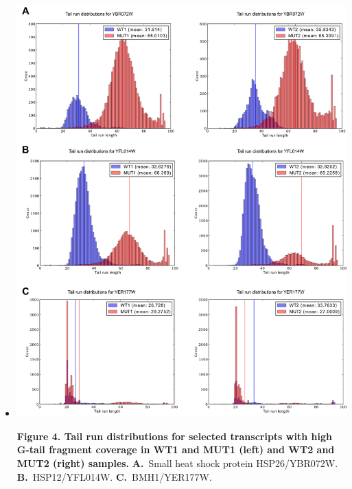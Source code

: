 \documentclass[10pt]{article}
\newcommand{\note}[1]{\textcolor{red}{[#1]}}  %
\begin{document}
\begin{itemize}
\item[]{
\begin{center}
\includegraphics[scale=0.9]{Figure5.png}
\end{center}

\textbf{Figure 4. Tail run distributions for selected transcripts with high G-tail fragment coverage in WT1 and MUT1 (left) and 
WT2 and MUT2 (right) samples.} \textbf{A.}~Small heat shock protein HSP26/YBR072W. \textbf{B.}~HSP12/YFL014W. \textbf{C.}~BMH1/YER177W.
}

\end{itemize}
\end{document}
